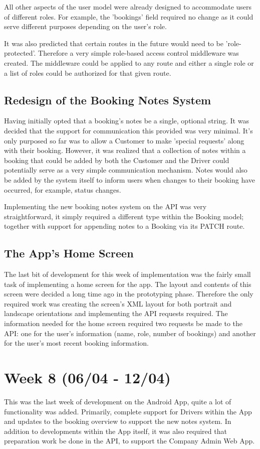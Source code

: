 All other aspects of the user model were already designed to accommodate users of different roles. For example, the 'bookings' field required no change as it could serve different purposes depending on the user's role. 

It was also predicted that certain routes in the future would need to be 'role-protected'. Therefore a very simple role-based access control middleware was created. The middleware could be applied to any route and either a single role or a list of roles could be authorized for that given route.

\subsection{Redesign of the Booking Notes System}
Having initially opted that a booking's notes be a single, optional string. It was decided that the support for communication this provided was very minimal. It's only purposed so far was to allow a Customer to make 'special requests' along with their booking. However, it was realized that a collection of notes within a booking that could be added by both the Customer and the Driver could potentially serve as a very simple communication mechanism. Notes would also be added by the system itself to inform users when changes to their booking have occurred, for example, status changes.

Implementing the new booking notes system on the API was very straightforward, it simply required a different type within the Booking model; together with support for appending notes to a Booking via its PATCH route.

\subsection{The App's Home Screen}
The last bit of development for this week of implementation was the fairly small task of implementing a home screen for the app. The layout and contents of this screen were decided a long time ago in the prototyping phase. Therefore the only required work was creating the screen's XML layout for both portrait and landscape orientations and implementing the API requests required. The information needed for the home screen required two requests be made to the API: one for the user's information (name, role, number of bookings) and another for the user's most recent booking information.

\section{Week 8 (06/04 - 12/04)}
This was the last week of development on the Android App, quite a lot of functionality was added. Primarily, complete support for Drivers within the App and updates to the booking overview to support the new notes system. In addition to developments within the App itself, it was also required that preparation work be done in the API, to support the Company Admin Web App.

